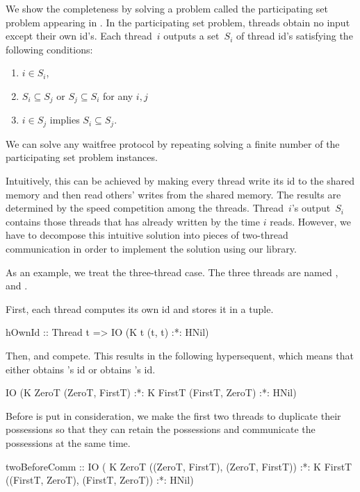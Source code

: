 We show the completeness by solving a problem called
the participating set problem appearing in \citet{participating}.
In the participating set problem, threads obtain no input except their own
id's.
Each thread~$i$ outputs a set~$S_i$ of thread id's satisfying the
following conditions:
\begin{enumerate}
 \item $i\in S_i$,
 \item $S_i\subseteq S_j$ or $S_j\subseteq S_i$ for any $i,j$
 \item $i\in S_j$ implies $S_i\subseteq S_j$.
\end{enumerate}
We can solve any waitfree protocol by repeating solving a finite number
of the participating set problem instances.

Intuitively, this can be achieved by making every thread write its id to
the shared memory and then read others' writes from the shared memory.
The results are determined by the speed competition among the threads.
Thread~$i$'s output~$S_i$ contains those threads that has already
written by the time $i$ reads.
However, we have to decompose this intuitive solution into pieces of
two-thread communication in order to implement the solution using our library.

As an example, we treat the three-thread case.  The three threads are
named \verb@ZeroT@, \verb@FirstT@ and \verb@SecondT@.

First, each thread computes its own id and stores it in a tuple.
\begin{spec}
hOwnId :: Thread t => IO (K t (t, t) :*: HNil)
\end{spec}
Then, \verb@ZeroT@ and \verb@FirstT@ compete.  This results in the
following hypersequent, which means that either \verb@ZeroT@ obtains
\verb@FirstT@'s id or \verb@FirstT@ obtains \verb@ZeroT@'s id.
\begin{spec}
IO (K ZeroT (ZeroT, FirstT) :*: K FirstT (FirstT, ZeroT) :*: HNil)
\end{spec}

Before \verb@SecondT@ is put in consideration, we make the first two threads
to duplicate their possessions so that they can retain the possessions
and communicate the possessions at the same time.
\begin{spec}
twoBeforeComm :: IO ( K ZeroT ((ZeroT, FirstT), (ZeroT, FirstT)) :*:
                      K FirstT ((FirstT, ZeroT), (FirstT, ZeroT)) :*:
                      HNil)
\end{spec}

